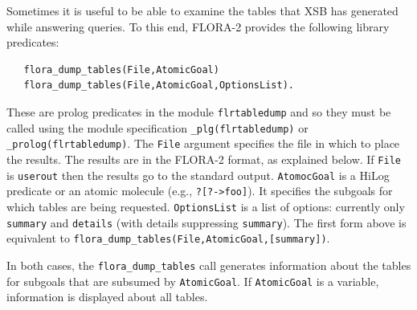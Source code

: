 \documentclass[11pt]{article}
\begin{document}
Sometimes it is useful to be able to examine the tables that XSB has
generated while answering queries. To this end, FLORA-2 provides 
the following library predicates:
\begin{verbatim}
   flora_dump_tables(File,AtomicGoal)
   flora_dump_tables(File,AtomicGoal,OptionsList).
\end{verbatim}
These are prolog predicates in the module \texttt{flrtabledump} and so they
must be called using the module specification \texttt{\_plg(flrtabledump)} or
\texttt{\_prolog(flrtabledump)}.
The \texttt{File} argument specifies the file in which to place the results.
The results are in the FLORA-2 format, as explained below.
If \texttt{File} is \texttt{userout} then the results go to the standard
output.  \texttt{AtomocGoal} is a HiLog predicate or an atomic molecule
(e.g., \texttt{?[?->foo]}). It specifies the subgoals for which tables are
being requested. \texttt{OptionsList} is a list of options: currently  only
\texttt{summary} and \texttt{details} (with details suppressing
\texttt{summary}).   
The first form above is equivalent to
\texttt{flora\_dump\_tables(File,AtomicGoal,[summary])}. 

In both cases, the \texttt{flora\_dump\_tables} call generates information
about the tables for subgoals that are subsumed by \texttt{AtomicGoal}. If
\texttt{AtomicGoal} is a variable, information is displayed about all
tables.   
\end{document}
